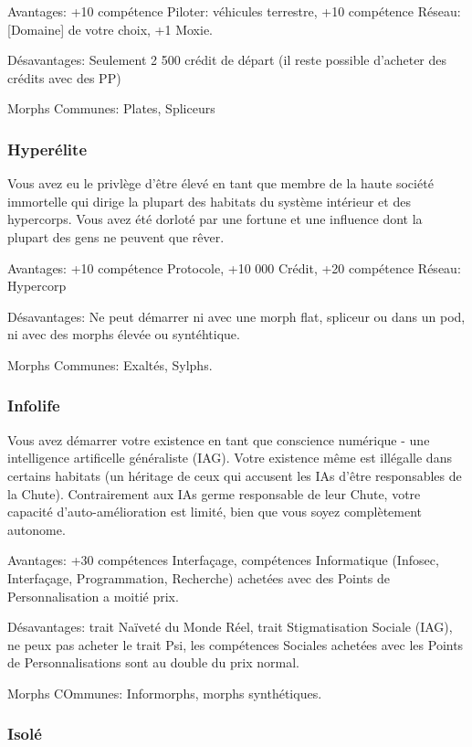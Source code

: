 Avantages: +10 compétence Piloter: véhicules terrestre, +10 compétence Réseau: [Domaine] de votre choix, +1 Moxie. 

Désavantages: Seulement 2 500 crédit de départ (il reste possible d'acheter des crédits avec des PP) 

Morphs Communes: Plates, Spliceurs 

\subsubsection{Hyperélite} \label{sec:hyperelite} 

Vous avez eu le privlège d'être élevé en tant que membre de la haute société immortelle qui dirige la plupart des habitats du système intérieur et des hypercorps. Vous avez été dorloté par une fortune et une influence dont la plupart des gens ne peuvent que rêver. 

Avantages: +10 compétence Protocole, +10 000 Crédit, +20 compétence Réseau: Hypercorp 

Désavantages: Ne peut démarrer ni avec une morph flat, spliceur ou dans un pod, ni avec des morphs élevée ou syntéhtique. 

Morphs Communes: Exaltés, Sylphs. 

\subsubsection{Infolife} \label{sec:infolife} 

Vous avez démarrer votre existence en tant que conscience numérique - une intelligence artificelle généraliste (IAG). Votre existence même est illégalle dans certains habitats (un héritage de ceux qui accusent les IAs d'être responsables de la Chute). Contrairement aux IAs germe responsable de leur Chute, votre capacité d'auto-amélioration est limité, bien que vous soyez complètement autonome. 

Avantages: +30 compétences Interfaçage, compétences Informatique (Infosec, Interfaçage, Programmation, Recherche) achetées avec des Points de Personnalisation a moitié prix. 

Désavantages: trait Naïveté du Monde Réel, trait Stigmatisation Sociale (IAG), ne peux pas acheter le trait Psi, les compétences Sociales achetées avec les Points de Personnalisations sont au double du prix normal. 

Morphs COmmunes: Informorphs, morphs synthétiques. 

\subsubsection{Isolé} \label{sec:isolite} 

